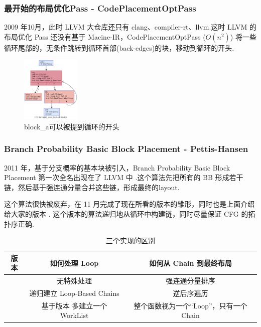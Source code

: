 \begin{frame}
    \frametitle{最开始的布局优化Pass - CodePlacementOptPass}

    2009 年10月，此时 LLVM 大仓库还只有 clang、compiler-rt、llvm.这时 LLVM 的布局优化 Pass 还没有基于 Macine-IR，CodePlacementOptPass ($O(n^2)$) \cite{llvmcodeplacementopt2009}将一些循环尾部的，无条件跳转到循环首部(back-edges)的块，移动到循环的开头.

    \begin{figure}
        \centering
        \includegraphics[width=0.25\textwidth]{images/slightly_more_involved.png}
        \caption{block\_a可以被提到循环的开头}
    \end{figure}

\end{frame}


\begin{frame}
    \frametitle{Branch Probability Basic Block Placement - Pettis-Hansen}

    2011 年，基于分支概率的基本块被引入，Branch Probability Basic Block Placement 第一次全名出现在了 LLVM 中 \cite{llvmmachineblockplacementintro2011}.这个算法先把所有的 BB 形成若干链，然后基于强连通分量合并这些链，形成最终的layout.

    这个算法很快被废弃，在 11 月完成了现在所看的版本的雏形，同时也是上面介绍给大家的版本 \cite{llvmmachineblockplacementimporve2011-1, llvmmachineblockplacementimporve2011-2}. 这个版本的算法递归地从循环中构建链，同时尽量保证 CFG 的拓扑序正确.

    \begin{table}
        \begin{tabular}{ccc}
            \toprule
            版本                                            & 如何处理 Loop                                                         & 如何从 Chain 到最终布局            \\
            \midrule
            \cite{llvmmachineblockplacementintro2011}     & 无特殊处理                                                             & 强连通分量排序                    \\
            \cite{llvmmachineblockplacementimporve2011-1} & 递归建立 Loop-Based Chains                                            & 逆后序遍历                      \\
            \cite{llvmmachineblockplacementimporve2011-2} & 基于版本 \cite{llvmmachineblockplacementimporve2011-1} 多建立一个 WorkList & 整个函数视为一个``Loop''，只有一个Chain \\
            \bottomrule
        \end{tabular}
        \caption{三个实现的区别}
    \end{table}

\end{frame}

